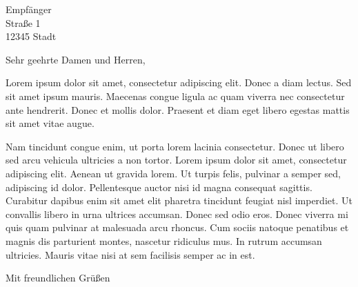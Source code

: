 \documentclass[%
 	fontsize=11pt,	%
 	paper=a4,	%
	parskip=half*,  %
	ngerman,        %
	version=last,
	fromlogo,
	]{scrlttr2}
\begin{document}
      
\begin{letter}{

Empfänger\\
Straße 1\\
12345 Stadt
}

\opening{Sehr geehrte Damen und Herren,}
Lorem ipsum dolor sit amet, consectetur adipiscing elit. Donec a diam lectus. Sed sit amet ipsum mauris. 
Maecenas congue ligula ac quam viverra nec consectetur ante hendrerit. Donec et mollis dolor. 
Praesent et diam eget libero egestas mattis sit amet vitae augue. 

Nam tincidunt congue enim, ut porta lorem lacinia consectetur. Donec ut libero sed arcu 
vehicula ultricies a non tortor. Lorem ipsum dolor sit amet, consectetur adipiscing elit. 
Aenean ut gravida lorem. Ut turpis felis, pulvinar a semper sed, adipiscing id dolor. Pellentesque auctor 
nisi id magna consequat sagittis. Curabitur dapibus enim sit amet elit pharetra tincidunt feugiat nisl imperdiet.
 Ut convallis libero in urna ultrices accumsan. Donec sed odio eros. Donec viverra mi quis quam pulvinar at 
 malesuada arcu rhoncus. Cum sociis natoque penatibus et magnis dis parturient montes, nascetur ridiculus mus. 
 In rutrum accumsan ultricies. Mauris vitae nisi at sem facilisis semper ac in est.


\closing{Mit freundlichen Grüßen}


%
%
\end{letter}
\end{document}
